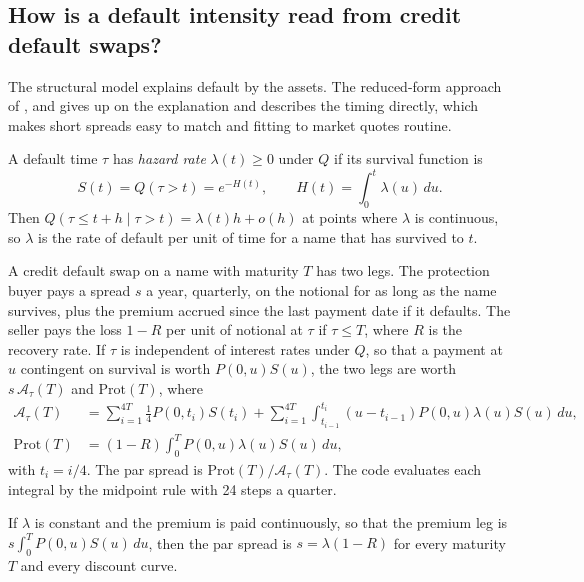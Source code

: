 \begin{chapterrefs}
\section{How is a default intensity read from credit default swaps?}
\label{sec6:hazard}

The structural model explains default by the assets. The reduced-form approach of
\textcite{jarrow1995}, \textcite{lando1998} and \textcite{duffie1999} gives up on the explanation and
describes the timing directly, which makes short spreads easy to match and fitting to market quotes
routine.

\begin{definition}\label{def6:hazard}
A default time $\tau$ has \emph{hazard rate} $\lambda(t)\ge0$ under $Q$ if its survival function is
\[
  S(t)=Q(\tau>t)=e^{-H(t)},\qquad H(t)=\int_0^t\lambda(u)\,du .
\]
Then $Q(\tau\le t+h\mid\tau>t)=\lambda(t)h+o(h)$ at points where $\lambda$ is continuous, so $\lambda$ is
the rate of default per unit of time for a name that has survived to $t$.
\end{definition}

A credit default swap on a name with maturity $T$ has two legs. The protection buyer pays a spread
$s$ a year, quarterly, on the notional for as long as the name survives, plus the premium accrued
since the last payment date if it defaults. The seller pays the loss $1-R$ per unit of notional at
$\tau$ if $\tau\le T$, where $R$ is the recovery rate. If $\tau$ is independent of interest rates under
$Q$, so that a payment at $u$ contingent on survival is worth $P(0,u)S(u)$, the two legs are worth
$s\,\mathcal A_\tau(T)$ and $\mathrm{Prot}(T)$, where
\begin{align*}
  \mathcal A_\tau(T)&=\sum_{i=1}^{4T}\tfrac14P(0,t_i)S(t_i)+\sum_{i=1}^{4T}\int_{t_{i-1}}^{t_i}(u-t_{i-1})P(0,u)\lambda(u)S(u)\,du,\\
  \mathrm{Prot}(T)&=(1-R)\int_0^TP(0,u)\lambda(u)S(u)\,du ,
\end{align*}
with $t_i=i/4$. The par spread is $\mathrm{Prot}(T)/\mathcal A_\tau(T)$. The code evaluates each integral
by the midpoint rule with 24 steps a quarter.

\begin{proposition}\label{prop6:triangle}
If $\lambda$ is constant and the premium is paid continuously, so that the premium leg is
$s\int_0^TP(0,u)S(u)\,du$, then the par spread is $s=\lambda(1-R)$ for every maturity $T$ and every
discount curve.
\end{proposition}


\end{chapterrefs}

